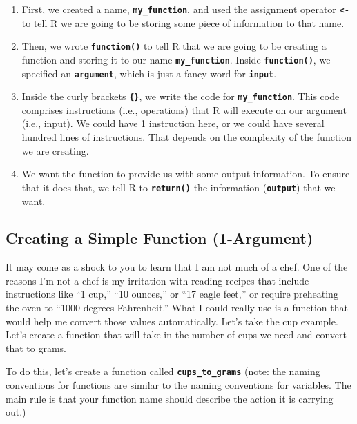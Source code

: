\documentclass[
]{book}
\begin{document}
\begin{enumerate}
\def\labelenumi{\arabic{enumi}.}
\item
  First, we created a name, \textbf{\texttt{my\_function}}, and used the assignment operator \textbf{\texttt{\textless{}-}} to tell R we are going to be storing some piece of information to that name.
\item
  Then, we wrote \textbf{\texttt{function()}} to tell R that we are going to be creating a function and storing it to our name \textbf{\texttt{my\_function}}. Inside \textbf{\texttt{function()}}, we specified an \textbf{\texttt{argument}}, which is just a fancy word for \textbf{\texttt{input}}.
\item
  Inside the curly brackets \textbf{\texttt{\{\}}}, we write the code for \textbf{\texttt{my\_function}}. This code comprises instructions (i.e., operations) that R will execute on our argument (i.e., input). We could have 1 instruction here, or we could have several hundred lines of instructions. That depends on the complexity of the function we are creating.
\item
  We want the function to provide us with some output information. To ensure that it does that, we tell R to \textbf{\texttt{return()}} the information (\textbf{\texttt{output}}) that we want.
\end{enumerate}

\hypertarget{creating-a-simple-function-1-argument}{%
\subsection{Creating a Simple Function (1-Argument)}\label{creating-a-simple-function-1-argument}}

It may come as a shock to you to learn that I am not much of a chef. One of the reasons I'm not a chef is my irritation with reading recipes that include instructions like ``1 cup,'' ``10 ounces,'' or ``17 eagle feet,'' or require preheating the oven to ``1000 degrees Fahrenheit.'' What I could really use is a function that would help me convert those values automatically. Let's take the cup example. Let's create a function that will take in the number of cups we need and convert that to grams.

To do this, let's create a function called \textbf{\texttt{cups\_to\_grams}} (note: the naming conventions for functions are similar to the naming conventions for variables. The main rule is that your function name should describe the action it is carrying out.)
\end{document}

